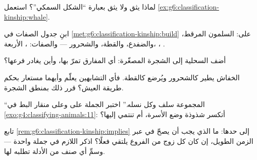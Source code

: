 \begin{exercise}[$\star\star$]\label{exo:g6:classification-kinship:7}
لماذا يثق    ولا يثق بعبارة ``الشكل السمكي''؟
استعمل \cref{ex:g6:classification-kinship:whale}.
\end{exercise}

\begin{exercise}[$\star\star$]\label{exo:g6:classification-kinship:8}
ابنِ جدول الصفات في \cref{met:g6:classification-kinship:build}
على: السلمون المرقط، والضفدع، والقطة، والشحرور --- والصفات: ،  الأربعة،  ، .
\end{exercise}

\begin{exercise}[$\star\star$]\label{exo:g6:classification-kinship:9}
أضف السحلية إلى الشجرة المصغّرة: أي المفارق تمرّ بها، وأين يغادر
فرعها؟
\end{exercise}

\begin{exercise}[$\star\star$]\label{exo:g6:classification-kinship:10}
الخفاش يطير كالشحرور ويُرضع كالقطة. فأي التشابهين يعلّم 
وأيهما مستعار بحكم طريقة العيش؟ قرر ذلك بمنطق الشجرة.
\end{exercise}

\begin{exercise}[$\star\star$]\label{exo:g6:classification-kinship:11}
``المجموعة سلف وكل نسله.'' اختبر الجملة على  وعلى منقار
البط في \cref{exo:g4:classifying-animals:11}: أتكسر شذوذة وضع
 الأسرة، أم تنتمي إليها؟
\end{exercise}

\begin{exercise}[$\star\star\star$]\label{exo:g6:classification-kinship:12}
تابع \cref{rem:g6:classification-kinship:implies} إلى حدها: ما
الذي يجب أن يصحّ في  عبر الزمن الطويل، إن كان كل زوج من
الفروع يلتقي فعلًا؟ اذكر اللازم في جملة واحدة --- وسمِّ أي صنف من
الأدلة تطلبه لها.
\end{exercise}

